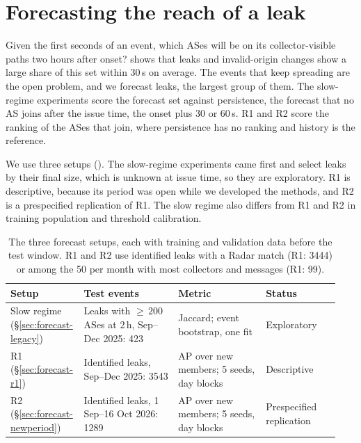 \section{Forecasting the reach of a leak}\label{sec:forecast}

Given the first seconds of an event, which ASes will be on its collector-visible paths two hours after onset?
 shows that leaks and invalid-origin changes show a large share of this set within 30\,s on average.
The events that keep spreading are the open problem, and we forecast leaks, the largest group of them.
The slow-regime experiments score the forecast set against persistence, the forecast that no AS joins after the issue time, the onset plus 30 or 60\,s.
R1 and R2 score the ranking of the ASes that join, where persistence has no ranking and history is the reference.

We use three setups ().
The slow-regime experiments came first and select leaks by their final size, which is unknown at issue time, so they are exploratory.
R1 is descriptive, because its period was open while we developed the methods, and R2 is a prespecified replication of R1.
The slow regime also differs from R1 and R2 in training population and threshold calibration.

\begin{table}[t]
\caption{The three forecast setups, each with training and validation data before the test window. R1 and R2 use identified leaks with a Radar match (R1: \num{3444}) or among the 50 per month with most collectors and messages (R1: 99).}
\label{tab:forecast-setups}
\footnotesize
\setlength{\tabcolsep}{2.5pt}
\begin{tabular}{@{}>{\raggedright\arraybackslash}p{0.17\linewidth}>{\raggedright\arraybackslash}p{0.29\linewidth}>{\raggedright\arraybackslash}p{0.26\linewidth}>{\raggedright\arraybackslash}p{0.22\linewidth}@{}}
\toprule
Setup & Test events & Metric & Status \\
\midrule
Slow regime (\S\ref{sec:forecast-legacy}) & Leaks with ${\geq}\,200$ ASes at 2\,h, Sep--Dec 2025: 423 & Jaccard; event bootstrap, one fit & Exploratory \\
R1 (\S\ref{sec:forecast-r1}) & Identified leaks, Sep--Dec 2025: \num{3543} & AP over new members; 5 seeds, day blocks & Descriptive \\
R2 (\S\ref{sec:forecast-newperiod}) & Identified leaks, 1 Sep--16 Oct 2026: \num{1289} & AP over new members; 5 seeds, day blocks & Prespecified replication \\
\bottomrule
\end{tabular}
\end{table}

